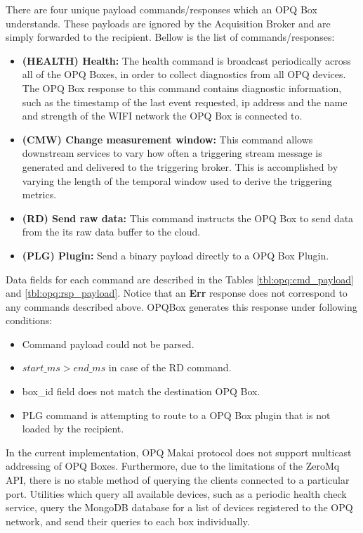 There are four unique payload commands/responses which an OPQ Box understands.
These payloads are ignored by the Acquisition Broker and are simply forwarded to the recipient.
Bellow is the list of commands/responses:
\begin{itemize}
	\item{\textbf{(HEALTH) Health:}} The health command is broadcast periodically across all of the OPQ Boxes, in order to collect diagnostics from all OPQ devices.
	The OPQ Box response to this command contains diagnostic information, such as the timestamp of the last event requested, ip address and the name and strength of the WIFI network the OPQ Box is connected to.
	\item{\textbf{(CMW) Change measurement window:}} This command allows downstream services to vary how often a triggering stream message is generated and delivered to the triggering broker.
	This is accomplished by varying the length of the temporal window used to derive the triggering metrics.
	\item{\textbf{(RD) Send raw data:}} This command instructs the OPQ Box to send data from the its raw data buffer to the cloud.
	\item {\textbf{(PLG) Plugin:}} Send a binary payload directly to a OPQ Box Plugin.
\end{itemize}
Data fields for each command are described in the Tables \ref{tbl:opq:cmd_payload} and \ref{tbl:opq:rsp_payload}.
Notice that an \textbf{Err} response does not correspond to any commands described above.
OPQBox generates this response under following conditions:
\begin{itemize}
	\item Command payload could not be parsed.
	\item $start\_ms > end\_ms$ in case of the RD command.
	\item box\_id field does not match the destination OPQ Box.
	\item PLG command is attempting to route to a OPQ Box plugin that is not loaded by the recipient.
\end{itemize}
In the current implementation, OPQ Makai protocol does not support multicast addressing of OPQ Boxes.
Furthermore, due to the limitations of the ZeroMq API, there is no stable method of querying the clients connected to a particular port.
Utilities which query all available devices, such as a periodic health check service, query the MongoDB database for a list of devices registered to the OPQ network, and send their queries to each box individually.
